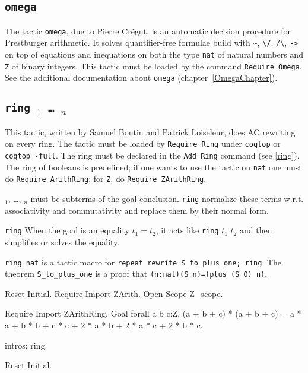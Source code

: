 \subsection{\tt omega}
\label{omega}

The tactic \texttt{omega}, due to Pierre Cr{\'e}gut,
is an automatic decision procedure for Prestburger
arithmetic. It solves quantifier-free 
formulae build with \verb|~|, \verb|\/|, \verb|/\|,
\verb|->| on top of equations and inequations on
both the type \texttt{nat} of natural numbers and \texttt{Z} of binary
integers. This tactic must be loaded by the command \texttt{Require
  Omega}. See the additional documentation about \texttt{omega}
(chapter~\ref{OmegaChapter}).

\subsection{\tt ring \term$_1$ \dots\ \term$_n$}

This tactic, written by Samuel Boutin and Patrick Loiseleur, 
does AC rewriting on every
ring. The tactic must be loaded by \texttt{Require Ring} under
\texttt{coqtop} or \texttt{coqtop -full}.
The ring must be declared in the \texttt{Add Ring}
command (see \ref{ring}). The ring of booleans is predefined; if one
wants to use the tactic on \texttt{nat} one must do \texttt{Require
  ArithRing}; for \texttt{Z}, do \texttt{Require ZArithRing}.

\term$_1$, \dots, \term$_n$ must be subterms of the goal
conclusion. \texttt{ring} normalize these terms
w.r.t. associativity and commutativity and replace them by their
normal form.

\begin{Variants}
\item \texttt{ring} When the goal is an equality $t_1=t_2$, it
  acts like \texttt{ring} $t_1$ $t_2$ and then simplifies or solves
  the equality.

\item \texttt{ring\_nat} is a tactic macro for \texttt{repeat rewrite
    S\_to\_plus\_one; ring}. The theorem \texttt{S\_to\_plus\_one} is a
  proof that \texttt{(n:nat)(S n)=(plus (S O) n)}.

\end{Variants}

\Example
\begin{coq_eval}
Reset Initial.
Require Import ZArith.
Open Scope Z_scope.
\end{coq_eval}
\begin{coq_example}
Require Import ZArithRing.
Goal
forall a b c:Z,
  (a + b + c) * (a + b + c) =
  a * a + b * b + c * c + 2 * a * b + 2 * a * c + 2 * b * c.
\end{coq_example}
\begin{coq_example}
intros; ring.
\end{coq_example}
\begin{coq_eval}
Reset Initial.
\end{coq_eval}

